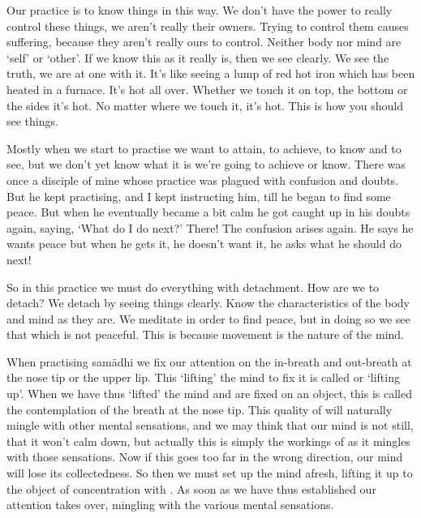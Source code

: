Our practice is to know things in this way. We don't have the power to really control these things, we aren't really their owners. Trying to control them causes suffering, because they aren't really ours to control. Neither body nor mind are `self' or `other'. If we know this as it really is, then we see clearly. We see the truth, we are at one with it. It's like seeing a lump of red hot iron which has been heated in a furnace. It's hot all over. Whether we touch it on top, the bottom or the sides it's hot. No matter where we touch it, it's hot. This is how you should see things.

Mostly when we start to practise we want to attain, to achieve, to know and to see, but we don't yet know what it is we're going to achieve or know. There was once a disciple of mine whose practice was plagued with confusion and doubts. But he kept practising, and I kept instructing him, till he began to find some peace. But when he eventually became a bit calm he got caught up in his doubts again, saying, `What do I do next?' There! The confusion arises again. He says he wants peace but when he gets it, he doesn't want it, he asks what he should do next!

So in this practice we must do everything with detachment. How are we to detach? We detach by seeing things clearly. Know the characteristics of the body and mind as they are. We meditate in order to find peace, but in doing so we see that which is not peaceful. This is because movement is the nature of the mind.

When practising sam\=adhi we fix our attention on the in-breath and out-breath at the nose tip or the upper lip. This `lifting' the mind to fix it is called  or `lifting up'. When we have thus `lifted' the mind and are fixed on an object, this is called  the contemplation of the breath at the nose tip. This quality of  will naturally mingle with other mental sensations, and we may think that our mind is not still, that it won't calm down, but actually this is simply the workings of  as it mingles with those sensations. Now if this goes too far in the wrong direction, our mind will lose its collectedness. So then we must set up the mind afresh, lifting it up to the object of concentration with . As soon as we have thus established our attention  takes over, mingling with the various mental sensations.

